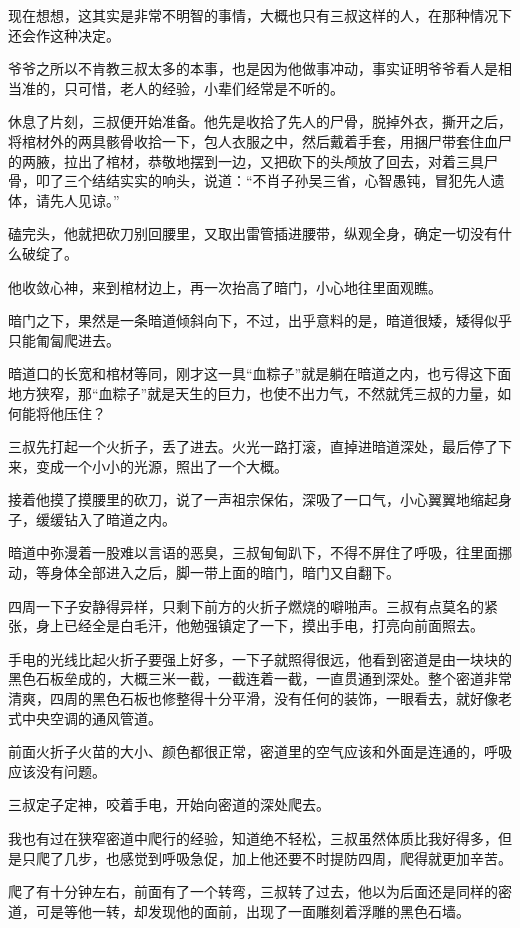 现在想想，这其实是非常不明智的事情，大概也只有三叔这样的人，在那种情况下还会作这种决定。

爷爷之所以不肯教三叔太多的本事，也是因为他做事冲动，事实证明爷爷看人是相当准的，只可惜，老人的经验，小辈们经常是不听的。

休息了片刻，三叔便开始准备。他先是收拾了先人的尸骨，脱掉外衣，撕开之后，将棺材外的两具骸骨收拾一下，包人衣服之中，然后戴着手套，用捆尸带套住血尸的两腋，拉出了棺材，恭敬地摆到一边，又把砍下的头颅放了回去，对着三具尸骨，叩了三个结结实实的响头，说道：“不肖子孙吴三省，心智愚钝，冒犯先人遗体，请先人见谅。”

磕完头，他就把砍刀别回腰里，又取出雷管插进腰带，纵观全身，确定一切没有什么破绽了。

他收敛心神，来到棺材边上，再一次抬高了暗门，小心地往里面观瞧。

暗门之下，果然是一条暗道倾斜向下，不过，出乎意料的是，暗道很矮，矮得似乎只能匍匐爬进去。

暗道口的长宽和棺材等同，刚才这一具“血粽子”就是躺在暗道之内，也亏得这下面地方狭窄，那“血粽子”就是天生的巨力，也使不出力气，不然就凭三叔的力量，如何能将他压住？

三叔先打起一个火折子，丢了进去。火光一路打滚，直掉进暗道深处，最后停了下来，变成一个小小的光源，照出了一个大概。

接着他摸了摸腰里的砍刀，说了一声祖宗保佑，深吸了一口气，小心翼翼地缩起身子，缓缓钻入了暗道之内。

暗道中弥漫着一股难以言语的恶臭，三叔甸甸趴下，不得不屏住了呼吸，往里面挪动，等身体全部进入之后，脚一带上面的暗门，暗门又自翻下。

四周一下子安静得异样，只剩下前方的火折子燃烧的噼啪声。三叔有点莫名的紧张，身上已经全是白毛汗，他勉强镇定了一下，摸出手电，打亮向前面照去。

手电的光线比起火折子要强上好多，一下子就照得很远，他看到密道是由一块块的黑色石板垒成的，大概三米一截，一截连着一截，一直贯通到深处。整个密道非常清爽，四周的黑色石板也修整得十分平滑，没有任何的装饰，一眼看去，就好像老式中央空调的通风管道。

前面火折子火苗的大小、颜色都很正常，密道里的空气应该和外面是连通的，呼吸应该没有问题。

三叔定子定神，咬着手电，开始向密道的深处爬去。

我也有过在狭窄密道中爬行的经验，知道绝不轻松，三叔虽然体质比我好得多，但是只爬了几步，也感觉到呼吸急促，加上他还要不时提防四周，爬得就更加辛苦。

爬了有十分钟左右，前面有了一个转弯，三叔转了过去，他以为后面还是同样的密道，可是等他一转，却发现他的面前，出现了一面雕刻着浮雕的黑色石墙。

